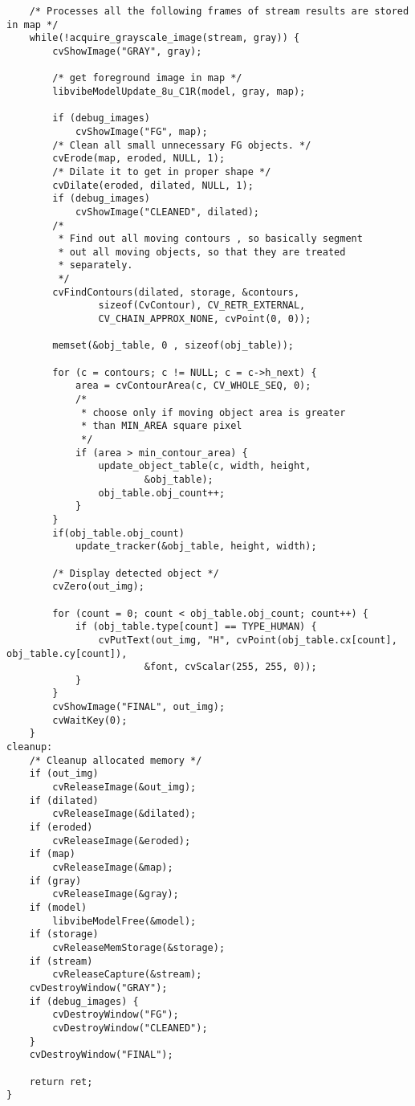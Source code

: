 \begin{lstlisting}
	/* Processes all the following frames of stream results are stored in map */
	while(!acquire_grayscale_image(stream, gray)) {
		cvShowImage("GRAY", gray);

		/* get foreground image in map */
		libvibeModelUpdate_8u_C1R(model, gray, map);

		if (debug_images)
			cvShowImage("FG", map);
		/* Clean all small unnecessary FG objects. */
		cvErode(map, eroded, NULL, 1);
		/* Dilate it to get in proper shape */
		cvDilate(eroded, dilated, NULL, 1);
		if (debug_images)
			cvShowImage("CLEANED", dilated);
		/*
		 * Find out all moving contours , so basically segment
		 * out all moving objects, so that they are treated
		 * separately.
		 */
		cvFindContours(dilated, storage, &contours,
				sizeof(CvContour), CV_RETR_EXTERNAL,
				CV_CHAIN_APPROX_NONE, cvPoint(0, 0));

		memset(&obj_table, 0 , sizeof(obj_table));

		for (c = contours; c != NULL; c = c->h_next) {
			area = cvContourArea(c, CV_WHOLE_SEQ, 0);
			/*
			 * choose only if moving object area is greater
			 * than MIN_AREA square pixel
			 */
			if (area > min_contour_area) {
				update_object_table(c, width, height,
						&obj_table);
				obj_table.obj_count++;
			}
		}
		if(obj_table.obj_count)
			update_tracker(&obj_table, height, width);

		/* Display detected object */
		cvZero(out_img);

		for (count = 0; count < obj_table.obj_count; count++) {
			if (obj_table.type[count] == TYPE_HUMAN) {
				cvPutText(out_img, "H", cvPoint(obj_table.cx[count], obj_table.cy[count]),
						&font, cvScalar(255, 255, 0));
			}
		}
		cvShowImage("FINAL", out_img);
		cvWaitKey(0);
	}
cleanup:
	/* Cleanup allocated memory */
	if (out_img)
		cvReleaseImage(&out_img);
	if (dilated)
		cvReleaseImage(&dilated);
	if (eroded)
		cvReleaseImage(&eroded);
	if (map)
		cvReleaseImage(&map);
	if (gray)
		cvReleaseImage(&gray);
	if (model)
		libvibeModelFree(&model);
	if (storage)
		cvReleaseMemStorage(&storage);
	if (stream)
		cvReleaseCapture(&stream);
	cvDestroyWindow("GRAY");
	if (debug_images) {
		cvDestroyWindow("FG");
		cvDestroyWindow("CLEANED");
	}
	cvDestroyWindow("FINAL");

	return ret;
}

\end{lstlisting}
